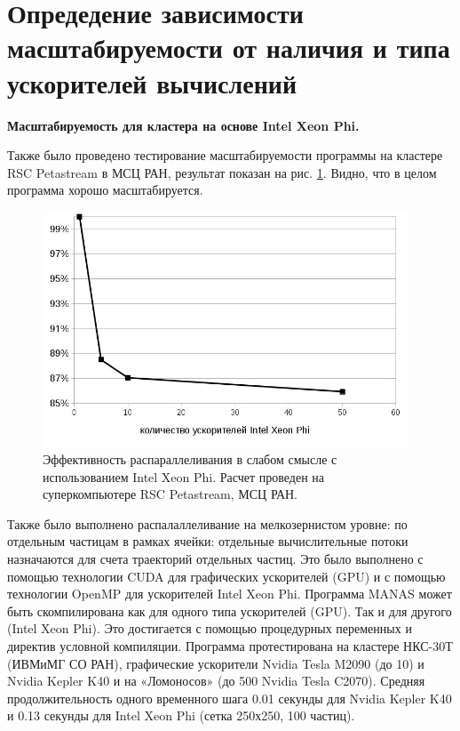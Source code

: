         
       
        
        \section{Опредедение зависимости масштабируемости от наличия и типа ускорителей вычислений}
        
        \textbf{Масштабируемость для кластера на основе Intel Xeon Phi.} 
        
       Также было проведено тестирование масштабируемости программы на кластере RSC Petastream в МСЦ РАН, результат показан на рис. \ref{phi100}. Видно, что в целом программа хорошо масштабируется.
        
        \begin{figure}[htb]
        	\begin{center}
        		\includegraphics[height=7cm,keepaspectratio]{images/petastream_phi100.jpg}
        	\end{center}
        	\caption{Эффективность распараллеливания в слабом смысле с использованием Intel Xeon Phi. Расчет проведен на суперкомпьютере RSC Petastream, МСЦ РАН.}
        	\label{phi100}
        \end{figure}
        
        Также было выполнено распалаллеливание на мелкозернистом уровне: по отдельным частицам в рамках ячейки: отдельные вычислительные потоки назначаются для счета траекторий отдельных частиц. Это было выполнено с помощью технологии CUDA для графических ускорителей (GPU) и с помощью технологии OpenMP для ускорителей Intel Xeon Phi. Программа MANAS может быть скомпилирована как для одного типа ускорителей (GPU). Так и для другого (Intel Xeon Phi). Это достигается с помощью процедурных переменных и директив условной компиляции. Программа протестирована на кластере НКС-30Т (ИВМиМГ СО РАН), графические ускорители Nvidia Tesla M2090 (до 10) и Nvidia Kepler K40 и на «Ломоносов»  (до 500 Nvidia Tesla C2070). Средняя продолжительность одного временного шага 0.01 секунды для  Nvidia Kepler K40 и 0.13 секунды для  Intel Xeon Phi (сетка 250х250, 100 частиц).
        

